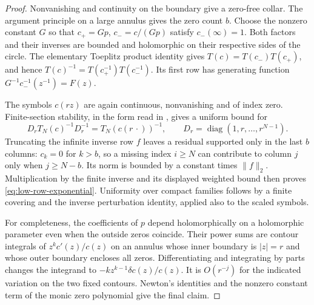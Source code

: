 \documentclass[11pt]{article}
\begin{document}
\begin{proof}
Nonvanishing and continuity on the boundary give a zero-free collar.
The argument principle on a large annulus gives the zero count $b$.
Choose the nonzero constant $G$ so that
$c_+=Gp$, $c_-=c/(Gp)$ satisfy $c_-(\infty)=1$. Both factors and
their inverses are bounded and holomorphic on their respective sides
of the circle. The elementary Toeplitz product identity gives
$T(c)=T(c_-)T(c_+)$, and hence
$T(c)^{-1}=T(c_+^{-1})T(c_-^{-1})$. Its first row has generating
function $G^{-1}c_-^{-1}(z^{-1})=F(z)$.

The symbols $c(rz)$ are again continuous, nonvanishing and of index
zero. Finite-section stability, in the form read in
\cite[Section~3, equation~(6)]{BFGM}, gives a uniform bound for
\[
 D_rT_N(c)^{-1}D_r^{-1}=T_N(c(r\,\cdot))^{-1},
 \qquad D_r=\operatorname{diag}(1,r,\ldots,r^{N-1}).
\]
Truncating the infinite inverse row $f$ leaves a residual supported
only in the last $b$ columns: $c_k=0$ for $k>b$, so a missing index
$i\ge N$ can contribute to column $j$ only when $j\ge N-b$.
Its norm is bounded by a constant times $\|f\|_2$.
Multiplication by the finite inverse and its displayed weighted bound
then proves \eqref{eq:low-row-exponential}. Uniformity over compact
families follows by a finite covering and the inverse perturbation
identity, applied also to the scaled symbols.

For completeness, the coefficients of $p$ depend holomorphically on a
holomorphic parameter even when the outside zeros coincide. Their
power sums are contour integrals of $z^k c'(z)/c(z)$ on an annulus
whose inner boundary is $|z|=r$ and whose outer boundary encloses all
zeros. Differentiating and integrating by parts changes the integrand
to $-kz^{k-1}\delta c(z)/c(z)$. It is $O(r^{-j})$ for the indicated
variation on the two fixed contours. Newton's identities and the
nonzero constant term of the monic zero polynomial give the final claim.
\end{proof}
\end{document}
